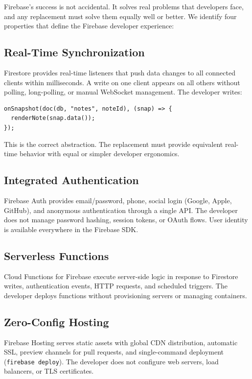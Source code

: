 \documentclass[11pt,a4paper]{article}
\begin{document}
Firebase's success is not accidental. It solves real problems that
developers face, and any replacement must solve them equally well or
better. We identify four properties that define the Firebase developer
experience:

\subsection{Real-Time Synchronization}

Firestore provides real-time listeners that push data changes to all
connected clients within milliseconds. A write on one client appears
on all others without polling, long-polling, or manual WebSocket
management. The developer writes:

\begin{lstlisting}
onSnapshot(doc(db, "notes", noteId), (snap) => {
  renderNote(snap.data());
});
\end{lstlisting}

This is the correct abstraction. The replacement must provide equivalent
real-time behavior with equal or simpler developer ergonomics.

\subsection{Integrated Authentication}

Firebase Auth provides email/password, phone, social login (Google, Apple,
GitHub), and anonymous authentication through a single API. The developer
does not manage password hashing, session tokens, or OAuth flows. User
identity is available everywhere in the Firebase SDK.

\subsection{Serverless Functions}

Cloud Functions for Firebase execute server-side logic in response to
Firestore writes, authentication events, HTTP requests, and scheduled
triggers. The developer deploys functions without provisioning servers
or managing containers.

\subsection{Zero-Config Hosting}

Firebase Hosting serves static assets with global CDN distribution,
automatic SSL, preview channels for pull requests, and single-command
deployment (\texttt{firebase deploy}). The developer does not configure
web servers, load balancers, or TLS certificates.
\end{document}
